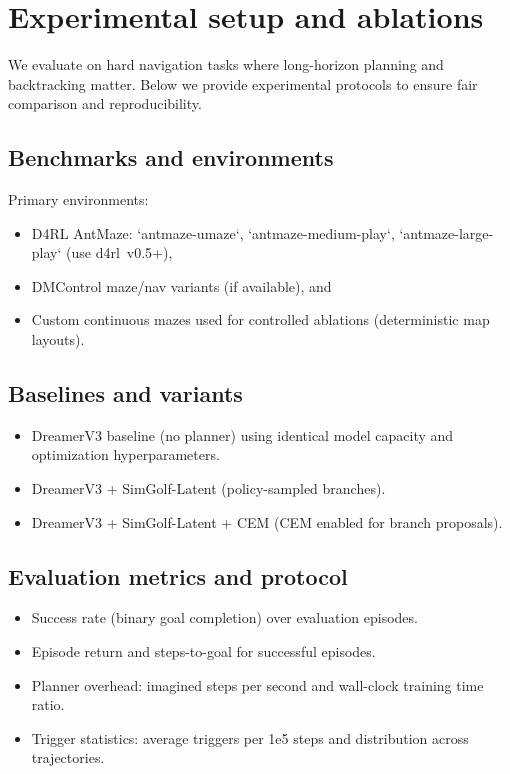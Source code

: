 \documentclass{article}
\begin{document}
\section{Experimental setup and ablations}
We evaluate on hard navigation tasks where long-horizon planning and backtracking
matter. Below we provide experimental protocols to ensure fair comparison and
reproducibility.

\subsection{Benchmarks and environments}
Primary environments:
\begin{itemize}
\item D4RL AntMaze: `antmaze-umaze`, `antmaze-medium-play`, `antmaze-large-play` (use d4rl~v0.5+),
\item DMControl maze/nav variants (if available), and
\item Custom continuous mazes used for controlled ablations (deterministic map layouts).
\end{itemize}

\subsection{Baselines and variants}
\begin{itemize}
\item DreamerV3 baseline (no planner) using identical model capacity and optimization hyperparameters.
\item DreamerV3 + SimGolf-Latent (policy-sampled branches).
\item DreamerV3 + SimGolf-Latent + CEM (CEM enabled for branch proposals).
\end{itemize}

\subsection{Evaluation metrics and protocol}
\begin{itemize}
\item Success rate (binary goal completion) over evaluation episodes.
\item Episode return and steps-to-goal for successful episodes.
\item Planner overhead: imagined steps per second and wall-clock training time ratio.
\item Trigger statistics: average triggers per 1e5 steps and distribution across trajectories.
\end{itemize}
\end{document}
